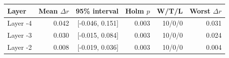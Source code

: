 \begin{tabular}{lrrrrr}
\toprule
Layer & Mean $\Delta r$ & 95\% interval & Holm $p$ & W/T/L & Worst $\Delta r$ \\
\midrule
Layer -4 & 0.042 & [-0.046, 0.151] & 0.003 & 10/0/0 & 0.031 \\
Layer -3 & 0.030 & [-0.015, 0.084] & 0.003 & 10/0/0 & 0.024 \\
Layer -2 & 0.008 & [-0.019, 0.036] & 0.003 & 10/0/0 & 0.004 \\
\bottomrule
\end{tabular}
